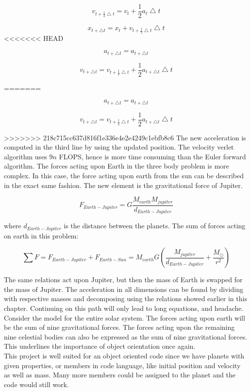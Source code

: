 \documentclass[10pt,a4paper]{article}
\begin{document}
$$v_{t+\frac{1}{2}\bigtriangleup t}=v_t + \frac{1}{2}a_t\bigtriangleup t$$

$$x_{t+\bigtriangleup t}=x_t + v_{t+\frac{1}{2}\bigtriangleup t}\bigtriangleup t $$
<<<<<<< HEAD

$$a_{t+\bigtriangleup t}=a_{t+\bigtriangleup t}$$

$$v_{t+\bigtriangleup t}=v_{t+\frac{1}{2}\bigtriangleup t} + \frac{1}{2}a_{t+\bigtriangleup t}\bigtriangleup t$$

=======

$$a_{t+\bigtriangleup t}=a_{t+\bigtriangleup t}$$

$$v_{t+\bigtriangleup t}=v_{t+\frac{1}{2}\bigtriangleup t} + \frac{1}{2}a_{t+\bigtriangleup t}\bigtriangleup t$$

>>>>>>> 218c715cc637d816f1e336e4e2e4249c1ebfb8c6
\noindent The new acceleration is computed in the third line by using the updated position. The velocity verlet algorithm uses $9n$ FLOPS, hence is more time consuming than the Euler forward algorithm. The forces acting upon Earth in the three body problem is more complex. In this case, the force acting upon earth from the sun can be described in the exact same fashion. The new element is the gravitational force of Jupiter. 

$$F_{Earth-Jupiter}=G\frac{M_{earth}M_{jupiter}}{d_{Earth-Jupiter}}$$

\noindent where $d_{Earth-Jupiter}$ is the distance between the planets. The sum of forces acting on earth in this problem: 

$$\sum F = F_{Earth-Jupiter}+ F_{Earth-Sun}= M_{earth}G(\frac{M_{jupiter}}{d_{Earth-Jupiter}} + \frac{M_{\odot}}{r^2}) $$

\noindent The same relations act upon Jupiter, but then the mass of Earth is swapped for the mass of Jupiter. The acceleration in all dimensions can be found by dividing with respective masses and decomposing using the relations showed earlier in this chapter. Continuing on this path will only lead to long equations, and headache. Consider the model for the entire solar system. The forces acting upon earth will be the sum of nine gravitational forces. The forces acting upon the remaining nine celestial bodies can also be expressed as the sum of nine gravitational forces. This underlines the importance of object orientation once again.\\

\noindent This project is well suited for an object oriented code since we have planets with given properties, or members in code language, like initial position and velocity as well as mass. Many more members could be assigned to the planet and the code would still work. \\
\end{document}
